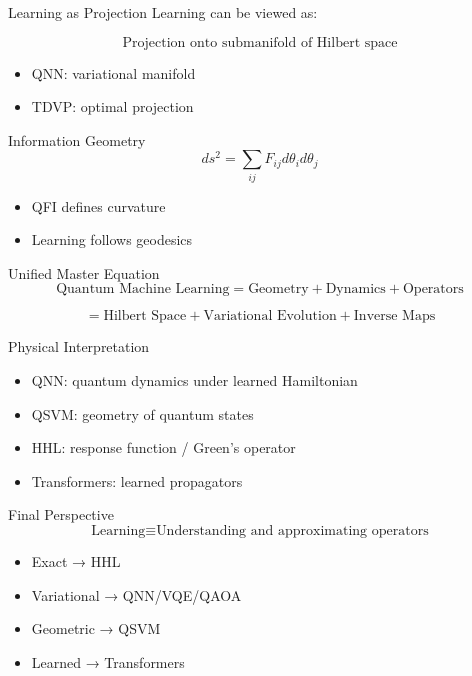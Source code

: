 \documentclass{beamer}
\begin{document}
\begin{frame}{Learning as Projection}
Learning can be viewed as:

\[
\text{Projection onto submanifold of Hilbert space}
\]

\begin{itemize}
\item QNN: variational manifold
\item TDVP: optimal projection
\end{itemize}
\end{frame}

\begin{frame}{Information Geometry}
\[
ds^2 = \sum_{ij} F_{ij} d\theta_i d\theta_j
\]

\begin{itemize}
\item QFI defines curvature
\item Learning follows geodesics
\end{itemize}
\end{frame}

\begin{frame}{Unified Master Equation}
\[
\boxed{
\text{Quantum Machine Learning}
=
\text{Geometry} + \text{Dynamics} + \text{Operators}
}
\]

\[
=
\text{Hilbert Space} + \text{Variational Evolution} + \text{Inverse Maps}
\]
\end{frame}

\begin{frame}{Physical Interpretation}
\begin{itemize}
\item QNN: quantum dynamics under learned Hamiltonian
\item QSVM: geometry of quantum states
\item HHL: response function / Green’s operator
\item Transformers: learned propagators
\end{itemize}
\end{frame}

\begin{frame}{Final Perspective}
\[
\boxed{
\text{Learning} \equiv \text{Understanding and approximating operators}
}
\]

\begin{itemize}
\item Exact → HHL
\item Variational → QNN/VQE/QAOA
\item Geometric → QSVM
\item Learned → Transformers
\end{itemize}
\end{frame}
\end{document}
